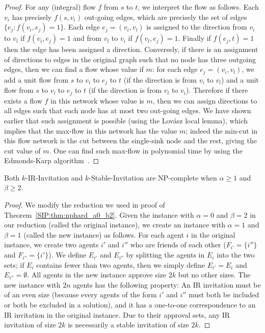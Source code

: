 \begin{proof}
	For any (integral) flow $f$ from $s$ to $t$, we interpret the flow as follows. Each $v_i$ has precisely $f(s, v_i)$ out-going edges, which are precisely the set of edges $\{e_j : f(v_i, e_j) = 1\}$. Each edge $e_j = (v_i, v_l)$ is assigned to the direction from $v_i$ to $v_l$ if $f(v_i, e_j) = 1$ and from $v_l$ to $v_i$ if $f(v_l, e_j) = 1$. Finally if $f(e_j, t) = 1$ then the edge has been assigned a direction. Conversely, if there is an assignment of directions to edges in the original graph such that no node has three outgoing edges, then we can find a flow whose value if $m$: for each edge $e_j = (v_i, v_l)$, we add a unit flow from $s$ to $v_i$ to $e_j$ to $t$ (if the direction is from $v_i$ to $v_l$) and a unit flow from $s$ to $v_l$ to $e_j$ to $t$ (if the direction is from $v_l$ to $v_i$). Therefore if there exists a flow $f$ in this network whose value is $m$, then we can assign directions to all edges such that each node has at most two out-going edges.  We have shown earlier that such assignment is possible (using the Lov{\'a}sz local lemma), which implies that the max-flow in this network has the value $m$; indeed the min-cut in this flow network is the cut between the single-sink node and the rest, giving the cut value of $m$.  One can find such max-flow in polynomial time by using the Edmonds-Karp algorithm~\cite{EdmondsKarp}.
\end{proof}

\begin{theorem} \label{SIP:thm:nphard_a1_b1}
	Both $k$-IR-Invitation and $k$-Stable-Invitation are NP-complete when $\alpha \geq 1$ and $\beta \geq 2$. 
\end{theorem} 
\begin{proof}
	We modify the reduction we used in proof of Theorem~\ref{SIP:thm:nphard_a0_b2}. 
	Given the instance with $\alpha = 0$ and $\beta = 2$ in our reduction (called the original instance), we create an instance with $\alpha = 1$ and $\beta = 1$ (called the new instance) as follows.
	For each agent $i$ in the original instance, we create two agents $i'$ and $i''$ who are friends of each other ($F_{i'} = \{i''\}$ and $F_{i''} = \{i'\}$). We define $E_{i'}$ and $E_{i''}$ by splitting the agents in $E_i$ into the two sets; if $E_i$ contains fewer than two agents, then we simply define $E_{i'} = E_i$ and $E_{i''} = \emptyset$. All agents in the new instance approve size $2k$ but no other sizes. The new instance with $2n$ agents has the following property: An IR invitation must be of an even size (because every agents of the form $i'$ and $i''$ must both be included or both be excluded in a solution), and it has a one-to-one correspondence to an IR invitation in the original instance. Due to their approval sets, any IR invitation of size $2k$ is necessarily a stable invitation of size $2k$. 
\end{proof}

